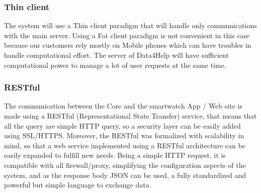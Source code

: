 \subsubsection{Thin client}
The system will use a Thin client paradigm that will handle only communications with the main server.
Using a Fat client paradigm is not convenient in this case because our customers rely mostly on Mobile phones which can have troubles in handle computational effort.
The server of Data4Help will have sufficient computational power to manage a lot of user requests at the same time.

\subsubsection{RESTful}
The communication between the Core and the smartwatch App / Web site is made using a RESTful (Representational State Transfer) service, that means that all the query are simple HTTP query, so a security layer can be easily added using SSL/HTTPS. Moreover, the RESTful was formalized with scalability in mind, so that a web service implemented using a RESTful architecture can be easily expanded to fulfill new needs.
Being a simple HTTP request, it is compatible with all firewall/proxy, simplifying the configuration aspects of the system, and as the response body JSON can be used, a fully standardized and powerful but simple language to exchange data.
